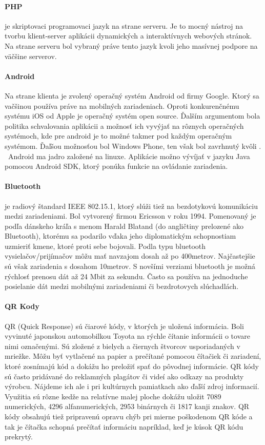 \paragraph{PHP} je skriptovaci programovaci jazyk na strane serveru. Je to mocný nástroj na tvorbu klient-server aplikácii dynamických a interaktívnych webových stránok. Na strane serveru bol vybraný práve tento jazyk kvoli jeho masívnej podpore na väčšine serverov.

\paragraph{Android} Na strane klienta je zvolený operačný systém Android od firmy Google. Ktorý sa vačšinou používa práve na mobilných zariadeniach. Oproti konkurenčnému systému iOS od Apple je operačný systém open source. Ďalším argumentom bola politika schvalovania aplikácii a možnosť ich vyvýjať na rôznych operačných systémoch, kde pre android je to možné takmer pod každým operačným systémom. Ďaľšou možnosťou bol Windows Phone, ten však bol zavrhnutý kvôli . \
Android ma jadro založené na linuxe. Aplikácie možno vývíjať v jazyku Java pomocou Android SDK, ktorý ponúka funkcie na ovládanie zariadenia.


\paragraph{Bluetooth} je radiový štandard IEEE 802.15.1, ktorý slúži tiež na bezdotykovú komunikáciu medzi zariadeniami. Bol vytvorený firmou Ericsson v roku 1994. Pomenovaný je podľa dánskeho kráľa s menom Harald Blatand (do angličtiny prelozené ako Bluetooth), ktorému sa podarilo vďaka jeho diplomatickým schopnostiam uzmieriť kmene, ktoré proti sebe bojovali. Podla typu bluetooth vysielačov/prijímačov môžu mať navzajom dosah až po 400metrov. Najčastejšie sú však zariadenia s dosahom 10metrov. S novšími verziami bluetooth je možná rýchlosť prenosu dát až 24 Mbit za sekundu. Často sa používa na jednoduche posielanie dát medzi mobilnými zariadeniami či bezdrotovych slúchadlách. 


\paragraph{QR Kody} QR (Quick Response) sú čiarové kódy, v ktorých je uložená informácia. Boli vyvinuté japonskou automobilkou Toyota na rýchle čítanie informácii o tovare nimi označenými. Sú zložené z bielych a čiernych štvorcov usporiadaných v mriežke. Môžu byť vytlačené na papier a prečítané pomocou čítačiek či zariadení, ktoré zosnímajú kód a dokážu ho preložiť spať do pôvodnej informácie.  QR kódy sú často pridávané do reklamných plagátov či videí ako odkazy na produkty výrobcu. Nájdeme ich ale i pri kultúrnych pamiatkach ako ďaľší zdroj informacií. Využitia sú rôzne kedže na relatívne malej ploche dokážu uložit 7089 numerických, 4296 alfanumerických, 2953 binárnych či 1817 kanji znakov. QR kódy obsahujú tiež pripravenú opravu chýb pri mierne poškodenom QR kóde a tak je čítačka schopná prečítať informáciu napríklad, keď je kúsok QR kódu prekrytý. 

